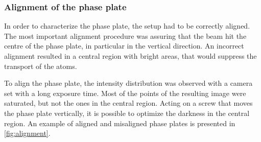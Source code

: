 \subsubsection{Alignment of the phase plate}
In order to characterize the phase plate, the setup had to be correctly aligned. The most important alignment procedure was assuring that the beam hit the centre of the phase plate, in particular in the vertical direction. An incorrect alignment resulted in a central region with bright areas, that would suppress the transport of the atoms.

To align the phase plate, the intensity distribution was observed with a camera set with a long exposure time. Most of the points of the resulting image were saturated, but not the ones in the central region. Acting on a screw that moves the phase plate vertically, it is possible to optimize the darkness in the central region. An example of aligned and misaligned phase plates is presented in \cref{fig:alignment}.
